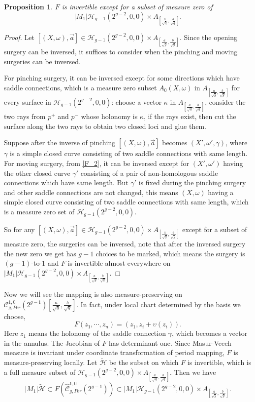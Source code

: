 \documentclass[12pt]{amsart} %
\newtheorem{proposition}[theorem]{Proposition}
\theoremstyle{definition}
\theoremstyle{remark}
\numberwithin{equation}{section}
\renewcommand\H{{\mathcal H}}
\begin{document}
\begin{proposition}
$F$ is invertible except for a subset of measure zero of 
$$|M_1|\H_{g-1}(2^{g-2},0,0)\times A_{[\frac{a}{\sqrt{g}},\frac{b}{\sqrt{g}}]}.$$
\end{proposition}
\begin{proof}
Let $[(X,\omega),\vec{a}]\in \H_{g-1}(2^{g-2},0,0)\times A_{[\frac{a}{\sqrt{g}},\frac{b}{\sqrt{g}}]}$.
Since the opening surgery can be inversed, it suffices to consider when the pinching and moving surgeries can be inversed.

For pinching surgery, it can be inversed except for some directions which have saddle connections, which is a measure zero subset $A_0(X,\omega)$
in $A_{[\frac{a}{\sqrt{g}},\frac{b}{\sqrt{g}}]}$ for every surface in $\H_{g-1}(2^{g-2},0,0)$: 
choose a vector $\kappa$ in $A_{[\frac{a}{\sqrt{g}},\frac{b}{\sqrt{g}}]}$, 
consider the two rays from $p^+$ and $p^-$ whose holonomy is $\kappa$, if the rays exist, then cut the surface along the two rays
to obtain two closed loci and glue them. 

Suppose after the inverse of pinching $[(X,\omega),\vec{a}]$ becomes $(X',\omega',\gamma)$, 
where $\gamma$ is a simple closed curve consisting of two saddle connections with same length.
For moving surgery, from \ref{F_2}, it can be inversed except for $(X',\omega')$ having the other closed curve $\gamma'$ consisting of a pair of non-homologous 
saddle connections which have same length. But $\gamma'$ is fixed during the pinching surgery and other saddle connections are not changed,
this means $(X,\omega)$ having a simple closed curve consisting of two saddle connections with same length,
which is a measure zero set of $\H_{g-1}(2^{g-2},0,0)$.

So for any $[(X,\omega),\vec{a}]\in \H_{g-1}(2^{g-2},0,0)\times A_{[\frac{a}{\sqrt{g}},\frac{b}{\sqrt{g}}]}$ except for a subset of measure zero, the surgeries can be inversed,
note that after the inversed surgery the new zero we get has $g-1$ choices to be marked,
which means the surgery is $(g-1)$-to-$1$ and $F$ is invertible almost everywhere on 
$|M_1|\H_{g-1}(2^{g-2},0,0)\times A_{[\frac{a}{\sqrt{g}},\frac{b}{\sqrt{g}}]}.$
\end{proof}

Now we will see the mapping is also measure-preserving on $\mathcal{C}^{1,0}_{g,Per}(2^{g-1})[\frac{a}{\sqrt{g}},\frac{b}{\sqrt{g}}]$.
In fact, under local chart determined by the basis we choose,
$$F(z_1,\cdots,z_n)=(z_1,z_i+\upsilon(z_i)).$$ 
Here $z_1$ means the holonomy of the saddle connection $\gamma$, which becomes a
vector in the annulus.
The Jacobian of $F$ has determinant one. Since Masur-Veech measure is invariant under coordinate transformation of period mapping, $F$ is measure-preserving locally.
Let $\tilde{\H}$ be the subset on which $F $ is invertible,
which is a full measure subset of $\H_{g-1}(2^{g-2},0,0)\times A_{[\frac{a}{\sqrt{g}},\frac{b}{\sqrt{g}}]}$.
Then we have
$$|M_1|\tilde{\H} \subset F( \hat{\mathcal{C}}^{1,0}_{g,Per}(2^{g-1}))\subset |M_1|\H_{g-1}(2^{g-2},0,0)\times A_{[\frac{a}{\sqrt{g}},\frac{b}{\sqrt{g}}]}.$$
\end{document}
